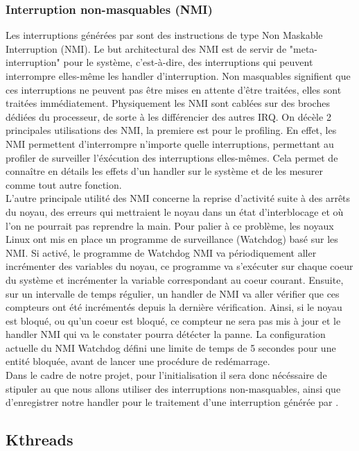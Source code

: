 					\subsubsection{Interruption non-masquables (NMI)}
						Les interruptions générées par \IBS sont des instructions de type Non Maskable Interruption (NMI). Le but architectural des NMI est de servir de "meta-interruption" pour le système, c'est-à-dire, des interruptions qui peuvent interrompre elles-même les handler d'interruption. Non masquables signifient que ces interruptions ne peuvent pas être mises en attente d'être traitées, elles sont traitées immédiatement. Physiquement les NMI sont cablées sur des broches dédiées du processeur, de sorte à les différencier des autres IRQ. On décèle 2 principales utilisations des NMI, la premiere est pour le profiling. En effet, les NMI permettent d'interrompre n'importe quelle interruptions, permettant au profiler de surveiller l'éxécution des interruptions elles-mêmes. Cela permet de connaître en détails les effets d'un handler sur le système et de les mesurer comme tout autre fonction.\\
						L'autre principale utilité des NMI concerne la reprise d'activité suite à des arrêts du noyau, des erreurs qui mettraient le noyau dans un état d'interblocage et où l'on ne pourrait pas reprendre la main. Pour palier à ce problème, les noyaux Linux ont mis en place un programme de surveillance (Watchdog) basé sur les NMI. Si activé, le programme de Watchdog NMI va périodiquement aller incrémenter des variables du noyau, ce programme va s'exécuter sur chaque coeur du système et incrémenter la variable correspondant au coeur courant. Ensuite, sur un intervalle de temps régulier, un handler de NMI va aller vérifier que ces compteurs ont été incrémentés depuis la dernière vérification. Ainsi, si le noyau est bloqué, ou qu'un coeur est bloqué, ce compteur ne sera pas mis à jour et le handler NMI qui va le constater pourra détécter la panne. La configuration actuelle du NMI Watchdog défini une limite de temps de 5 secondes pour une entité bloquée, avant de lancer une procédure de redémarrage.\\
						Dans le cadre de notre projet, pour l'initialisation il sera donc nécéssaire de stipuler au \lap que nous allons utiliser des interruptions non-masquables, ainsi que d'enregistrer notre handler pour le traitement d'une interruption générée par \IBS.
				\subsection{Kthreads}
